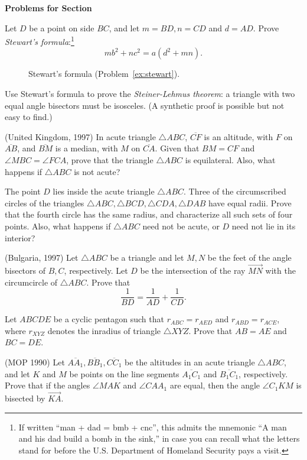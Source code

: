 \documentclass[12pt]{book}
\newcounter{exc}
\numberwithin{exc}{section}
\numberwithin{figure}{section}
\newenvironment{exer}{\vspace{0.1in}
\noindent \textbf{Problems for Section~\thesection} \vspace{0.1in}
\begin{list}{\arabic{exc}.}{\usecounter{exc}}}{\end{list}}
\numberwithin{equation}{theorem}
\def\ii{\item}
\def\ray#1{\overrightarrow{#1}}
\def\seg#1{\overline{#1}}
\begin{document}
\begin{exer}
\ii \label{ex:stewart}
Let $D$ be a point on side $BC$, and let $m = BD, n = CD$ and $d = 
AD$. Prove \emph{Stewart's formula}:\footnote{If written 
``man + dad = bmb + cnc'', this admits the mnemonic
``A man and his dad build a bomb in the sink,'' in case you can
recall what the letters stand for before the U.S. Department
of Homeland Security pays a visit.} 
\[
mb^2 + nc^2 = a (d^{2} + 
mn).
\]
\begin{figure}[ht]
\caption{Stewart's formula (Problem~\ref{ex:stewart}).}
\end{figure}

\ii Use Stewart's formula to prove the \emph{Steiner-Lehmus
theorem}: 
a triangle with two equal angle bisectors must be
isosceles. (A synthetic proof is possible but not easy to find.)

\ii
(United Kingdom, 1997) 
In acute triangle $\triangle ABC$, $\seg{CF}$ is an altitude,
with $F$ on $\seg{AB}$, and $\seg{BM}$ is a median, with $M$ on $\seg{CA}$. 
Given that
$BM=CF$ and $\angle MBC = \angle FCA$, prove that the triangle $\triangle ABC$
is equilateral. Also, what happens if $\triangle ABC$ is not acute?

\ii 
The
point $D$ lies inside the acute triangle $\triangle ABC$.  Three of the
circumscribed circles of the triangles $\triangle ABC, \triangle BCD, 
\triangle CDA, \triangle DAB$ have equal
radii. Prove that the fourth circle has the same radius, and
characterize all such sets of four points. Also, 
what happens if $\triangle ABC$ need
not be acute, or $D$ need not lie in its interior?

\ii (Bulgaria, 1997)
Let $\triangle ABC$ be a triangle and let $M,N$ be the feet of the angle
bisectors of $B,C$, respectively. Let $D$ be the intersection of the
ray $\ray{MN}$ with the circumcircle of $\triangle ABC$. Prove that
\[
\frac{1}{BD} = \frac{1}{AD} + \frac{1}{CD}.
\]

\ii %
Let $ABCDE$ be a cyclic pentagon such that $r_{ABC} = r_{AED}$ and 
$r_{ABD} = r_{ACE}$, where $r_{XYZ}$ denotes the inradius of triangle 
$\triangle XYZ$. Prove that $AB = AE$ and $BC = DE$.

\ii %
(MOP 1990)
Let $\seg{AA_{1}}, \seg{BB_{1}}, \seg{CC_{1}}$ 
be the altitudes in an acute triangle 
$\triangle ABC$, and 
let $K$ and $M$ be points on the line segments $\seg{A_{1}C_{1}}$ and 
$\seg{B_{1}C_{1}}$, respectively. Prove that if the angles 
$\angle MAK$ and 
$\angle CAA_{1}$ are equal, then the angle $\angle C_{1}KM$ is bisected 
by $\ray{KA}$.
\end{exer}
\end{document}
